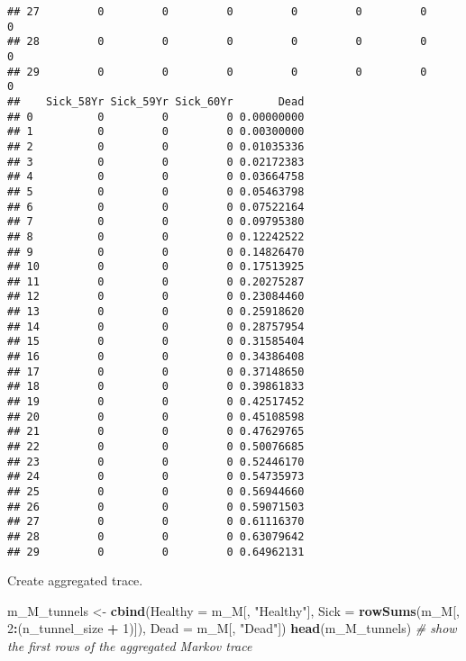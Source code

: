 \documentclass[
]{article}
\newenvironment{Shaded}{\begin{snugshade}}{\end{snugshade}}
\newcommand{\CommentTok}[1]{\textcolor[rgb]{0.56,0.35,0.01}{\textit{#1}}}
\newcommand{\DataTypeTok}[1]{\textcolor[rgb]{0.13,0.29,0.53}{#1}}
\newcommand{\DecValTok}[1]{\textcolor[rgb]{0.00,0.00,0.81}{#1}}
\newcommand{\KeywordTok}[1]{\textcolor[rgb]{0.13,0.29,0.53}{\textbf{#1}}}
\newcommand{\NormalTok}[1]{#1}
\newcommand{\OperatorTok}[1]{\textcolor[rgb]{0.81,0.36,0.00}{\textbf{#1}}}
\newcommand{\StringTok}[1]{\textcolor[rgb]{0.31,0.60,0.02}{#1}}
\begin{document}
\begin{verbatim}
## 27         0         0         0         0         0         0         0
## 28         0         0         0         0         0         0         0
## 29         0         0         0         0         0         0         0
##    Sick_58Yr Sick_59Yr Sick_60Yr       Dead
## 0          0         0         0 0.00000000
## 1          0         0         0 0.00300000
## 2          0         0         0 0.01035336
## 3          0         0         0 0.02172383
## 4          0         0         0 0.03664758
## 5          0         0         0 0.05463798
## 6          0         0         0 0.07522164
## 7          0         0         0 0.09795380
## 8          0         0         0 0.12242522
## 9          0         0         0 0.14826470
## 10         0         0         0 0.17513925
## 11         0         0         0 0.20275287
## 12         0         0         0 0.23084460
## 13         0         0         0 0.25918620
## 14         0         0         0 0.28757954
## 15         0         0         0 0.31585404
## 16         0         0         0 0.34386408
## 17         0         0         0 0.37148650
## 18         0         0         0 0.39861833
## 19         0         0         0 0.42517452
## 20         0         0         0 0.45108598
## 21         0         0         0 0.47629765
## 22         0         0         0 0.50076685
## 23         0         0         0 0.52446170
## 24         0         0         0 0.54735973
## 25         0         0         0 0.56944660
## 26         0         0         0 0.59071503
## 27         0         0         0 0.61116370
## 28         0         0         0 0.63079642
## 29         0         0         0 0.64962131
\end{verbatim}

Create aggregated trace.

\begin{Shaded}
\begin{Highlighting}[]
\NormalTok{m_M_tunnels <-}\StringTok{ }\KeywordTok{cbind}\NormalTok{(}\DataTypeTok{Healthy =}\NormalTok{ m_M[, }\StringTok{"Healthy"}\NormalTok{], }
                \DataTypeTok{Sick =} \KeywordTok{rowSums}\NormalTok{(m_M[, }\DecValTok{2}\OperatorTok{:}\NormalTok{(n_tunnel_size }\OperatorTok{+}\StringTok{ }\DecValTok{1}\NormalTok{)]), }
                \DataTypeTok{Dead =}\NormalTok{ m_M[, }\StringTok{"Dead"}\NormalTok{])}
\KeywordTok{head}\NormalTok{(m_M_tunnels) }\CommentTok{# show the first rows of the aggregated Markov trace}
\end{Highlighting}
\end{Shaded}
\end{document}
